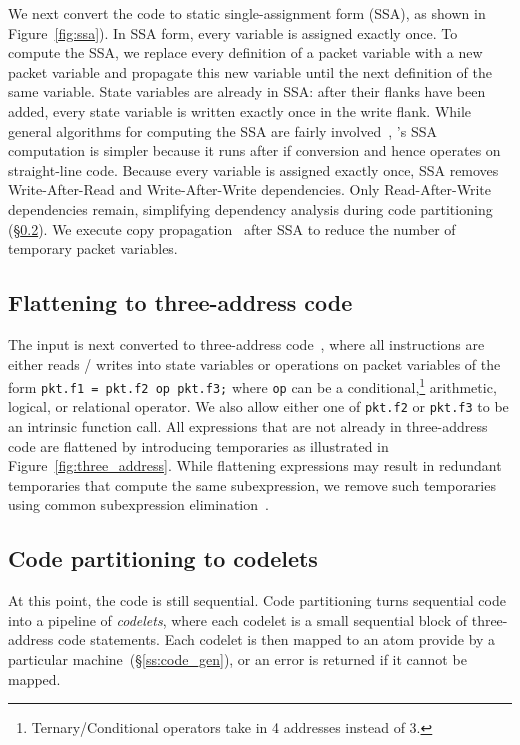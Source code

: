 We next convert the code to static single-assignment form (SSA), as shown in
Figure~\ref{fig:ssa}). In SSA form, every variable is assigned exactly once. To
compute the SSA, we replace every definition of a packet variable with a new
packet variable and propagate this new variable until the next definition of
the same variable. State variables are already in SSA: after their flanks have
been added, every state variable is written exactly once in the write flank.
While general algorithms for computing the SSA are fairly involved~\cite{ssa},
\pktlanguage's SSA computation is simpler because it runs after if conversion
and hence operates on straight-line code.  Because every variable is assigned
exactly once, SSA removes Write-After-Read and Write-After-Write dependencies.
Only Read-After-Write dependencies remain, simplifying dependency analysis
during code partitioning (\S\ref{ss:partitioning}). We execute copy
propagation~\cite{copy_prop} after SSA to reduce the number of temporary
packet variables.

\subsection{Flattening to three-address code}

The input is next converted to three-address code~\cite{tac}, where all
instructions are either reads / writes into state variables or operations on
packet variables of the form \texttt{pkt.f1 = pkt.f2 op pkt.f3;} where
\texttt{op} can be a conditional,\footnote{Ternary/Conditional operators take
in 4 addresses instead of 3.} arithmetic, logical, or relational operator.
We also allow either one of {\tt pkt.f2} or {\tt pkt.f3} to be an intrinsic
function call.  All expressions that are not already in three-address code
are flattened by introducing temporaries as illustrated in
Figure~\ref{fig:three_address}.  While flattening expressions may result in
redundant temporaries that compute the same subexpression, we remove such temporaries
 using common subexpression elimination~\cite{cse}.

\subsection{Code partitioning to codelets}
\label{ss:partitioning}
At this point, the code is still sequential. Code partitioning turns sequential
code into a pipeline of \textit{codelets}, where each codelet is a small
sequential block of three-address code statements. Each codelet is then mapped
to an atom provide by a particular \absmachine machine~(\S\ref{ss:code_gen}),
or an error is returned if it cannot be mapped.

